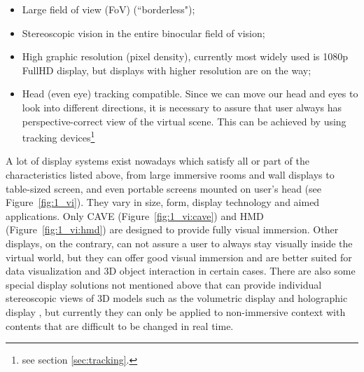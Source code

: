 \begin{itemize}
\item Large field of view (FoV) (``borderless");
\item Stereoscopic vision in the entire binocular field of vision;
\item High graphic resolution (pixel density), currently most widely used is 1080p FullHD display, but displays with higher resolution are on the way;
\item Head (even eye) tracking compatible. Since we can move our head and eyes to look into different directions, it is necessary to assure that user always has perspective-correct view of the virtual scene. This can be achieved by using tracking devices\footnote{see section \ref{sec:tracking}.}
\end{itemize}

A lot of display systems exist nowadays which satisfy all or part of the characteristics listed above, from large immersive rooms and wall displays to table-sized screen, and even portable screens mounted on user's head (see Figure~\ref{fig:1_vi}). They vary in size, form, display technology and aimed applications. Only CAVE (Figure~\ref{fig:1_vi:cave}) and HMD (Figure~\ref{fig:1_vi:hmd}) are designed to provide fully visual immersion. Other displays, on the contrary, can not assure a user to always stay visually inside the virtual world, but they can offer good visual immersion and are better suited for data visualization and 3D object interaction in certain cases. There are also some special display solutions not mentioned above that can provide individual stereoscopic views of 3D models such as the volumetric display \citep{Grossman2008Volum} and holographic display \citep{Lucente1997Holo}, but currently they can only be applied to non-immersive context with contents that are difficult to be changed in real time.


